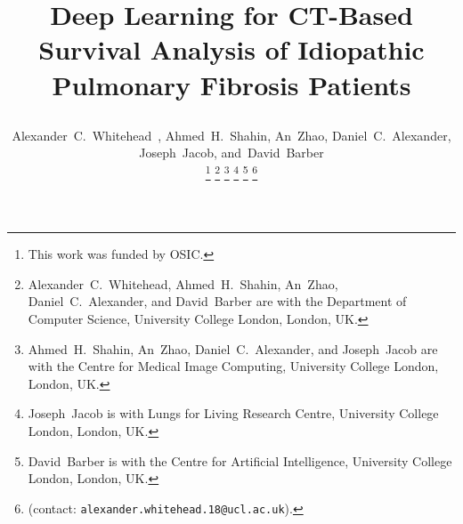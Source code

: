 \documentclass{IEEEtran}
\begin{document}
    \title{
        \vspace{-0.75cm}
        
        Deep Learning for CT-Based Survival Analysis of Idiopathic Pulmonary Fibrosis Patients
    }
    
    \author{
        \vspace{-0.25cm}

        Alexander~C.~Whitehead~,
        Ahmed~H.~Shahin,
        An~Zhao,
        Daniel~C.~Alexander,
        Joseph~Jacob,
        and~David~Barber
    
        \vspace{-0.75cm}

        \thanks{
            \scriptsize
            This work was funded by \gls{OSIC}.
        }
        \thanks{
            \scriptsize
            Alexander~C.~Whitehead, Ahmed~H.~Shahin, An~Zhao, Daniel~C.~Alexander, and David~Barber are with the Department of Computer Science, University College London, London, UK.
        }
        \thanks{
            \scriptsize
            Ahmed~H.~Shahin, An~Zhao, Daniel~C.~Alexander, and Joseph~Jacob are with the Centre for Medical Image Computing, University College London, London, UK.
        }
        \thanks{
            \scriptsize
            Joseph~Jacob is with Lungs for Living Research Centre, University College London, London, UK.
        }
        \thanks{
            \scriptsize
            David~Barber is with the Centre for Artificial Intelligence, University College London, London, UK.
        }
        \thanks{
            \scriptsize
            (contact: \texttt{alexander.whitehead.18@ucl.ac.uk}).
        }
    }
    
    \pagestyle{plain}
    
    \maketitle
    
\end{document}
